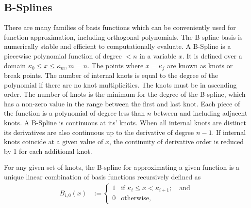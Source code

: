 \newpage

\subsection{B-Splines}


There are many families of basis functions which can be conveniently used for
function approximation, including orthogonal polynomials. The B-spline basis
\citep{DeBoor1972} is numerically stable and efficient to computationally
evaluate. A B-Spline is a piecewise polynomial function of degree $< n$ in a
variable $x$. It is defined over a domain $\kappa_0 \leq x \leq \kappa_m, m=n$.
The points where $x = \kappa_j$ are known as knots or break points. The number
of internal knots is equal to the degree of the polynomial if there are no knot
multiplicities. The knots must be in ascending order. The number of knots is
the minimum for the degree of the B-spline, which has a non-zero value in the
range between the first and last knot. Each piece of the function is a
polynomial of degree less than $n$ between and including adjacent knots. A
B-Spline is continuous at its' knots. When all internal knots are distinct its
derivatives are also continuous up to the derivative of degree $n - 1$. If
internal knots coincide at a given value of $x$, the continuity of derivative
order is reduced by 1 for each additional knot.

For any given set of knots, the B-spline for approximating a given function is
a unique linear combination of basis functions recursively defined as
$$
\begin{array}{rl}
	B_{i, 0}(x) & := \begin{cases}                                                                                                        
	1           & \text{if } \kappa_i \leq x < \kappa_{i+1};  \quad \text{and}                                                                                         \\
	0           & \text{otherwise,}                                                                                                        
	\end{cases}
\end{array}
$$

